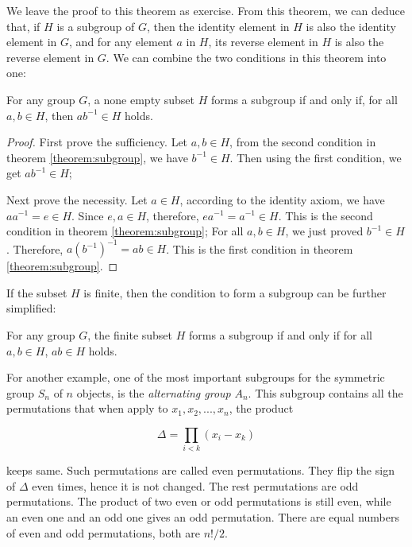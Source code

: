 \documentclass[b5paper]{article}
\begin{document}
We leave the proof to this theorem as exercise. From this theorem, we can deduce that, if $H$ is a subgroup of $G$, then the identity element in $H$ is also the identity element in $G$, and for any element $a$ in $H$, its reverse element in $H$ is also the reverse element in $G$. We can combine the two conditions in this theorem into one:

\begin{theorem}
For any group $G$, a none empty subset $H$ forms a subgroup if and only if, for all $a, b \in H$, then $ab^{-1} \in H$ holds.
\label{theorem:subgroup-2}
\end{theorem}

\begin{proof}
First prove the sufficiency. Let $a, b \in H$, from the second condition in theorem \ref{theorem:subgroup}, we have $b^{-1} \in H$. Then using the first condition, we get $ab^{-1} \in H$;

Next prove the necessity. Let $a \in H$, according to the identity axiom, we have $aa^{-1} = e \in H$. Since $e, a \in H$, therefore, $ea^{-1} = a^{-1} \in H$. This is the second condition in theorem \ref{theorem:subgroup}; For all $a, b \in H$, we just proved $b^{-1} \in H$. Therefore, $a(b^{-1})^{-1} = ab \in H$. This is the first condition in theorem \ref{theorem:subgroup}.
\end{proof}

If the subset $H$ is finite, then the condition to form a subgroup can be further simplified:

\begin{theorem}
For any group $G$, the finite subset $H$ forms a subgroup if and only if for all $a, b \in H$, $ab \in H$ holds.
\end{theorem}

For another example, one of the most important subgroups for the symmetric group $S_n$ of $n$ objects, is the {\em alternating group} $A_n$. This subgroup contains all the permutations that when apply to $x_1, x_2, ..., x_n$, the product

\[
\Delta = \displaystyle \prod_{i < k} (x_i - x_k)
\]

keeps same. Such permutations are called even permutations. They flip the sign of $\Delta$ even times, hence it is not changed. The rest permutations are odd permutations. The product of two even or odd permutations is still even, while an even one and an odd one gives an odd permutation. There are equal numbers of even and odd permutations, both are $n!/2$.
\end{document}
